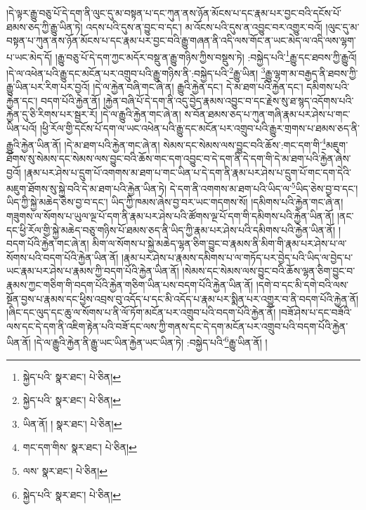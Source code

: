 །དེ་ལྟར་རྒྱུ་བཅུ་པོ་དེ་དག་ནི་ལུང་དུ་མ་བསྟན་པ་དང་ཀུན་ནས་ཉོན་མོངས་པ་དང་རྣམ་པར་བྱང་བའི་དངོས་པོ་ཐམས་ཅད་ཀྱི་རྒྱུ་ཡིན་ཏེ། འདས་པའི་དུས་ན་བྱུང་བ་དང་། མ་འོངས་པའི་དུས་ན་འབྱུང་བར་འགྱུར་བའོ། །ལུང་དུ་མ་བསྟན་པ་ཀུན་ནས་ཉོན་མོངས་པ་དང་རྣམ་པར་བྱང་བའི་རྒྱུ་གཞན་ནི་འདི་ལས་གོང་ན་ཡང་མེད་ལ་འདི་ལས་ལྷག་པ་ཡང་མེད་དོ། །རྒྱུ་བཅུ་པོ་དེ་དག་ཀྱང་མདོར་བསྡུ་ན་རྒྱུ་གཉིས་ཀྱིས་བསྡུས་ཏེ། :བསྐྱེད་པའི་\footnote{སྐྱེད་པའི་  སྣར་ཐང་།  པེ་ཅིན། }རྒྱུ་དང་ཐབས་ཀྱི་རྒྱུའོ། །དེ་ལ་འཕེན་པའི་རྒྱུ་དང་མངོན་པར་འགྲུབ་པའི་རྒྱུ་གཉིས་ནི་:བསྐྱེད་པའི་\footnote{སྐྱེད་པའི་  སྣར་ཐང་།  པེ་ཅིན། }རྒྱུ་ཡིན། \footnote{ཡིན་ནོ། །   སྣར་ཐང་།  པེ་ཅིན། }རྒྱུ་ལྷག་མ་བརྒྱད་ནི་ཐབས་ཀྱི་རྒྱུ་ཡིན་པར་རིག་པར་བྱའོ། །དེ་ལ་རྐྱེན་བཞི་གང་ཞེ་ན། རྒྱུའི་རྐྱེན་དང་། དེ་མ་ཐག་པའི་རྐྱེན་དང་། དམིགས་པའི་རྐྱེན་དང་། བདག་པོའི་རྐྱེན་ནོ། །རྐྱེན་བཞི་པོ་དེ་དག་ནི་འདུ་བྱེད་རྣམས་འབྱུང་བ་དང་རྗེས་སུ་ཐ་སྙད་འདོགས་པའི་རྐྱེན་དུ་ཅི་རིགས་པར་སྦྱར་རོ། །དེ་ལ་རྒྱུའི་རྐྱེན་གང་ཞེ་ན། ས་བོན་ཐམས་ཅད་པ་ཀུན་གཞི་རྣམ་པར་ཤེས་པ་གང་ཡིན་པའོ། །ཕྱི་རོལ་གྱི་དངོས་པོ་དག་ལ་ཡང་འཕེན་པའི་རྒྱུ་དང་མངོན་པར་འགྲུབ་པའི་རྒྱུར་གྲགས་པ་ཐམས་ཅད་ནི་རྒྱུའི་རྐྱེན་ཡིན་ནོ། །དེ་མ་ཐག་པའི་རྐྱེན་གང་ཞེ་ན། སེམས་དང་སེམས་ལས་བྱུང་བའི་ཆོས་:གང་དག་གི་\footnote{གང་དག་གིས་  སྣར་ཐང་།  པེ་ཅིན། }མཇུག་ཐོགས་སུ་སེམས་དང་སེམས་ལས་བྱུང་བའི་ཆོས་གང་དག་འབྱུང་བ་དེ་དག་ནི་དེ་དག་གི་དེ་མ་ཐག་པའི་རྐྱེན་ཞེས་བྱའོ། །རྣམ་པར་ཤེས་པ་དྲུག་པོ་འགགས་མ་ཐག་པ་གང་ཡིན་པ་དེ་དག་ནི་རྣམ་པར་ཤེས་པ་དྲུག་པོ་གང་དག་དེའི་མཇུག་ཐོགས་སུ་སྐྱེ་བའི་དེ་མ་ཐག་པའི་རྐྱེན་ཡིན་ཏེ། དེ་དག་ནི་འགགས་མ་ཐག་པའི་ཡིད་ལ་\footnote{ལས་  སྣར་ཐང་།  པེ་ཅིན། }ཡིད་ཅེས་བྱ་བ་དང་། ཡིད་ཀྱི་སྐྱེ་མཆེད་ཅེས་བྱ་བ་དང་། ཡིད་ཀྱི་ཁམས་ཞེས་བྱ་བར་ཡང་གདགས་སོ། །དམིགས་པའི་རྐྱེན་གང་ཞེ་ན། གཟུགས་ལ་སོགས་པ་ཡུལ་ལྔ་པོ་དག་ནི་རྣམ་པར་ཤེས་པའི་ཚོགས་ལྔ་པོ་དག་གི་དམིགས་པའི་རྐྱེན་ཡིན་ནོ། །ནང་དང་ཕྱི་རོལ་གྱི་སྐྱེ་མཆེད་བཅུ་གཉིས་པོ་ཐམས་ཅད་ནི་ཡིད་ཀྱི་རྣམ་པར་ཤེས་པའི་དམིགས་པའི་རྐྱེན་ཡིན་ནོ། །བདག་པོའི་རྐྱེན་གང་ཞེ་ན། མིག་ལ་སོགས་པ་སྐྱེ་མཆེད་ལྷན་ཅིག་བྱུང་བ་རྣམས་ནི་མིག་གི་རྣམ་པར་ཤེས་པ་ལ་སོགས་པའི་བདག་པོའི་རྐྱེན་ཡིན་ནོ། །རྣམ་པར་ཤེས་པ་རྣམས་དམིགས་པ་ལ་གཏོད་པར་བྱེད་པའི་ཡིད་ལ་བྱེད་པ་ཡང་རྣམ་པར་ཤེས་པ་རྣམས་ཀྱི་བདག་པོའི་རྐྱེན་ཡིན་ནོ། །སེམས་དང་སེམས་ལས་བྱུང་བའི་ཆོས་ལྷན་ཅིག་བྱུང་བ་རྣམས་ཀྱང་གཅིག་གི་བདག་པོའི་རྐྱེན་གཅིག་ཡིན་པས་བདག་པོའི་རྐྱེན་ཡིན་ནོ། །དགེ་བ་དང་མི་དགེ་བའི་ལས་སྔོན་བྱས་པ་རྣམས་དང་ཕྱིས་འབྲས་བུ་འདོད་པ་དང་མི་འདོད་པ་རྣམ་པར་སྨིན་པར་འགྱུར་བ་ནི་བདག་པོའི་རྐྱེན་ནོ། །ཞིང་དང་ལུད་དང་ཆུ་ལ་སོགས་པ་ནི་ལོ་ཏོག་མངོན་པར་འགྲུབ་པའི་བདག་པོའི་རྐྱེན་ནོ། །བཟོ་ཤེས་པ་དང་བཟོའི་ལས་དང་དེ་དག་ནི་འཇིག་རྟེན་པའི་བཟོ་དང་ལས་ཀྱི་གནས་དང་དེ་དག་མངོན་པར་འགྲུབ་པའི་བདག་པོའི་རྐྱེན་ཡིན་ནོ། །དེ་ལ་རྒྱུའི་རྐྱེན་ནི་རྒྱུ་ཡང་ཡིན་རྐྱེན་ཡང་ཡིན་ཏེ། :བསྐྱེད་པའི་\footnote{སྐྱེད་པའི་  སྣར་ཐང་།  པེ་ཅིན། }རྒྱུ་ཡིན་ནོ། །

